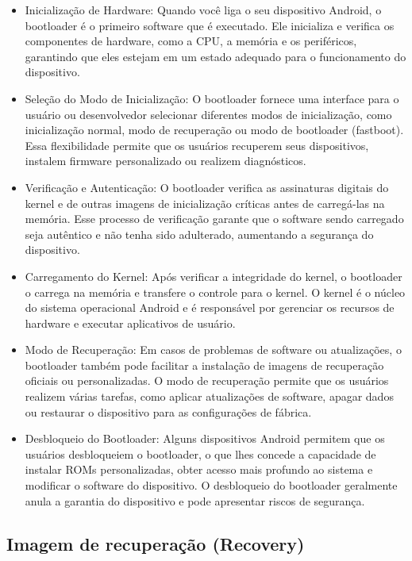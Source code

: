 \begin{itemize}
    \item Inicialização de Hardware: Quando você liga o seu dispositivo Android, o bootloader é o primeiro software que é executado. Ele inicializa e verifica os componentes de hardware, como a CPU, a memória e os periféricos, garantindo que eles estejam em um estado adequado para o funcionamento do dispositivo.
    \item Seleção do Modo de Inicialização: O bootloader fornece uma interface para o usuário ou desenvolvedor selecionar diferentes modos de inicialização, como inicialização normal, modo de recuperação ou modo de bootloader (fastboot). Essa flexibilidade permite que os usuários recuperem seus dispositivos, instalem firmware personalizado ou realizem diagnósticos.
    \item Verificação e Autenticação: O bootloader verifica as assinaturas digitais do kernel e de outras imagens de inicialização críticas antes de carregá-las na memória. Esse processo de verificação garante que o software sendo carregado seja autêntico e não tenha sido adulterado, aumentando a segurança do dispositivo.
    \item Carregamento do Kernel: Após verificar a integridade do kernel, o bootloader o carrega na memória e transfere o controle para o kernel. O kernel é o núcleo do sistema operacional Android e é responsável por gerenciar os recursos de hardware e executar aplicativos de usuário.
    \item Modo de Recuperação: Em casos de problemas de software ou atualizações, o bootloader também pode facilitar a instalação de imagens de recuperação oficiais ou personalizadas. O modo de recuperação permite que os usuários realizem várias tarefas, como aplicar atualizações de software, apagar dados ou restaurar o dispositivo para as configurações de fábrica.
    \item Desbloqueio do Bootloader: Alguns dispositivos Android permitem que os usuários desbloqueiem o bootloader, o que lhes concede a capacidade de instalar ROMs personalizadas, obter acesso mais profundo ao sistema e modificar o software do dispositivo. O desbloqueio do bootloader geralmente anula a garantia do dispositivo e pode apresentar riscos de segurança.
\end{itemize}


\subsection{Imagem de recuperação (Recovery)}
\label{recovery}

